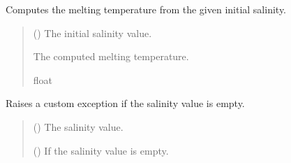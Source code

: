 \documentclass[a4paper,11pt,english,openany]{sphinxmanual}
\begin{document}
\begin{fulllineitems}
\label{\detokenize{api/spyice.preprocess.initial_boundary_conditions:spyice.preprocess.initial_boundary_conditions.compute_melting_temperature_from_salinity}}
\pysigstartsignatures
{}
\pysigstopsignatures
\sphinxAtStartPar
Computes the melting temperature from the given initial salinity.
\begin{quote}\begin{description}
\sphinxAtStartPar
{} () \textendash{} The initial salinity value.

\sphinxAtStartPar
The computed melting temperature.

\sphinxAtStartPar
float

\end{description}\end{quote}

\end{fulllineitems}


\begin{fulllineitems}
\label{\detokenize{api/spyice.preprocess.initial_boundary_conditions:spyice.preprocess.initial_boundary_conditions.raise_salinity_exception}}
\pysigstartsignatures
{}
\pysigstopsignatures
\sphinxAtStartPar
Raises a custom exception if the salinity value is empty.
\begin{quote}\begin{description}
\sphinxAtStartPar
{} () \textendash{} The salinity value.

\sphinxAtStartPar
{\hyperref[\detokenize{api/spyice.preprocess.initial_boundary_conditions:spyice.preprocess.initial_boundary_conditions.SalinityUnavailableError}]{}} () \textendash{} If the salinity value is empty.

\end{description}\end{quote}

\end{fulllineitems}
\end{document}
